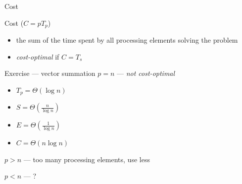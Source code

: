 \documentclass[10pt, t]{beamer}
\begin{document}
  \begin{frame}{Cost}
    \begin{block}{Cost ($C=pT_p$)}
      \begin{itemize}
        \item the sum of the time spent by all processing elements solving the
          problem
        \item \emph{cost-optimal} if $C=T_s$
      \end{itemize}
    \end{block}

    \vspace{-2ex}
    \begin{center}
    \end{center}
  \end{frame}

  \begin{frame}{Exercise --- vector summation}
    $p=n$ --- \emph{not cost-optimal}
    \begin{itemize}
      \item $T_p=\Theta(\log n)$
      \item $S=\Theta(\frac{n}{\log n})$
      \item $E=\Theta(\frac{1}{\log n})$
      \item $C=\Theta(n\log n)$
    \end{itemize}

    $p>n$ --- too many processing elements, use less

    $p<n$ --- ?
  \end{frame}
\end{document}
